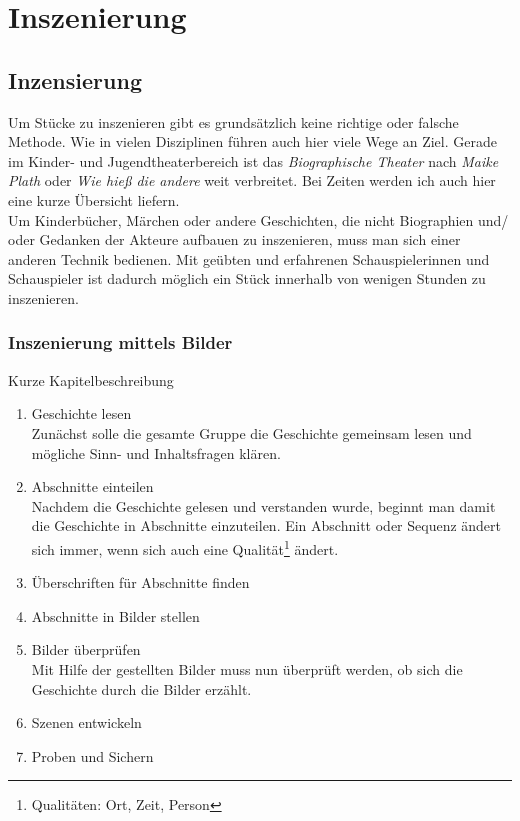 \documentclass[ngerman, a4paper, twoside]{scrbook}%
\begin{document}
	\setcounter{chapter}{0}
	\setcounter{section}{0}
	\part{Inszenierung}
	\chapter{Inzensierung}
	Um Stücke zu inszenieren gibt es grundsätzlich keine richtige oder falsche Methode. Wie in vielen Disziplinen führen auch hier viele Wege an Ziel. Gerade im Kinder- und Jugendtheaterbereich ist das \emph{Biographische Theater} nach \emph{Maike Plath} oder \emph{Wie hieß die andere} weit verbreitet. Bei Zeiten werden ich auch hier eine kurze Übersicht liefern. \\
	Um Kinderbücher, Märchen oder andere Geschichten, die nicht Biographien und/ oder Gedanken der Akteure aufbauen zu inszenieren, muss man sich einer anderen Technik bedienen. Mit geübten und erfahrenen Schauspielerinnen und Schauspieler ist dadurch möglich ein Stück innerhalb von wenigen Stunden zu inszenieren.

	\section{Inszenierung mittels Bilder}
	Kurze Kapitelbeschreibung

	\begin{enumerate}
		\item Geschichte lesen\\
			Zunächst solle die gesamte Gruppe die Geschichte gemeinsam lesen und mögliche Sinn- und Inhaltsfragen klären.
		\item Abschnitte einteilen\\
			Nachdem die Geschichte gelesen und verstanden wurde, beginnt man damit die Geschichte in Abschnitte einzuteilen. Ein Abschnitt oder Sequenz ändert sich immer, wenn sich auch eine Qualität\footnote{Qualitäten: Ort, Zeit, Person} ändert.
		\item Überschriften für Abschnitte finden
		\item Abschnitte in Bilder stellen
		\item Bilder überprüfen\\
			Mit Hilfe der gestellten Bilder muss nun überprüft werden, ob sich die Geschichte durch die Bilder erzählt.
		\item Szenen entwickeln
		\item Proben und Sichern
	\end{enumerate}
\end{document}
